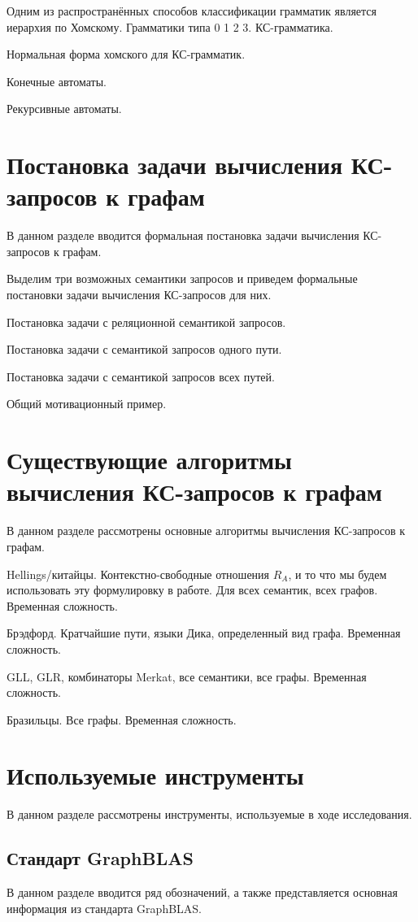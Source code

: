 Одним из распространённых способов классификации грамматик является иерархия по Хомскому. Грамматики типа 0 1 2 3. КС-грамматика.

Нормальная форма хомского для КС-грамматик.

Конечные автоматы.

Рекурсивные автоматы.


\section{Постановка задачи вычисления КС-запросов к графам}\label{sec:ch1/sec3}
В данном разделе вводится формальная постановка задачи вычисления КС-запросов к графам.

Выделим три возможных семантики запросов и приведем формальные постановки задачи вычисления КС-запросов для них.

Постановка задачи с реляционной семантикой запросов.

Постановка задачи с семантикой запросов одного пути.

Постановка задачи с семантикой запросов всех путей.

Общий мотивационный пример.

\section{Существующие алгоритмы вычисления КС-запросов к графам}\label{sec:ch1/sec4}
В данном разделе рассмотрены основные алгоритмы вычисления КС-запросов к графам.

Hellings/китайцы. Контекстно-свободные отношения $R_A$, и то что мы будем использовать эту формулировку в работе. Для всех семантик, всех графов. Временная сложность.

Брэдфорд. Кратчайшие пути, языки Дика, определенный вид графа. Временная сложность.

GLL, GLR, комбинаторы Merkat, все семантики, все графы. Временная сложность.

Бразильцы. Все графы. Временная сложность.

\section{Используемые инструменты}\label{sec:ch1/sec5}
В данном разделе рассмотрены инструменты, используемые в ходе исследования.

\subsection{Стандарт GraphBLAS}
В данном разделе вводится ряд обозначений, а также представляется основная информация из стандарта GraphBLAS.

